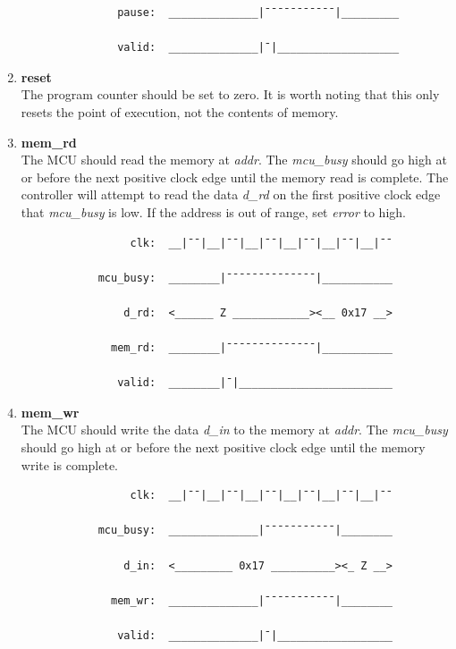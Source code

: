 \documentclass[10pt,a4paper]{article}
\begin{document}
\begin{enumerate}
\begin{verbatim}
               pause:  ______________|¯¯¯¯¯¯¯¯¯¯¯|_________

               valid:  ______________|¯|___________________
        \end{verbatim}

    \item\textbf{reset}\\
    The program counter should be set to zero. It is worth noting that this only resets the point of
    execution, not the contents of memory.

    \item\textbf{mem\_rd}\\
    The MCU should read the memory at \emph{addr}. The \emph{mcu\_busy} should go
     high at or before the next positive clock edge until the memory read is complete. The
    controller will attempt to read the data \emph{d\_rd} on the first positive clock edge that
    \emph{mcu\_busy} is low. If the address is out of range, set \emph{error} to high.

        \begin{verbatim}
                 clk:  __|¯¯|__|¯¯|__|¯¯|__|¯¯|__|¯¯|__|¯¯

            mcu_busy:  ________|¯¯¯¯¯¯¯¯¯¯¯¯¯¯|___________

                d_rd:  <______ Z ____________><__ 0x17 __>

              mem_rd:  ________|¯¯¯¯¯¯¯¯¯¯¯¯¯¯|___________

               valid:  ________|¯|________________________
        \end{verbatim}

    \newpage
    \item\textbf{mem\_wr}\\
    The MCU should write the data \emph{d\_in} to the memory at \emph{addr}. The \emph{mcu\_busy}
    should go high at or before the next positive clock edge until the memory write is complete.

        \begin{verbatim}
                 clk:  __|¯¯|__|¯¯|__|¯¯|__|¯¯|__|¯¯|__|¯¯

            mcu_busy:  ______________|¯¯¯¯¯¯¯¯¯¯¯|________

                d_in:  <_________ 0x17 __________><_ Z __>

              mem_wr:  ______________|¯¯¯¯¯¯¯¯¯¯¯|________

               valid:  ______________|¯|__________________
        \end{verbatim}


\end{enumerate}
\end{document}
